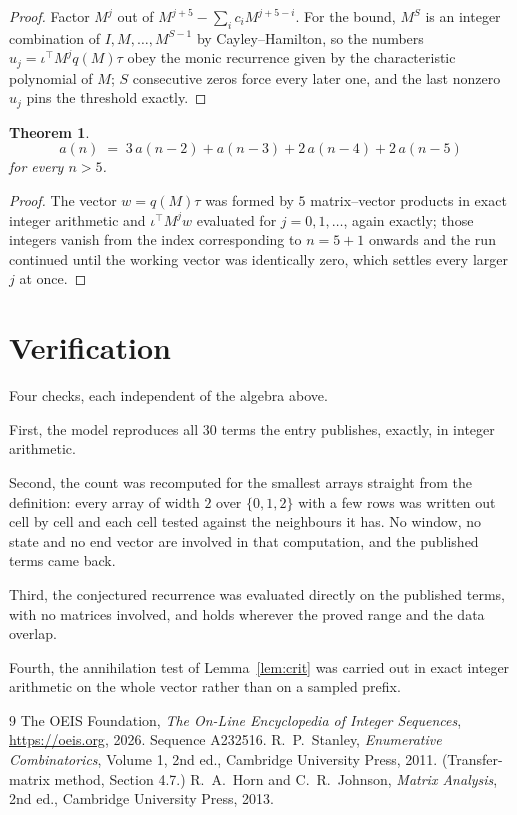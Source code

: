 \documentclass[11pt,a4paper]{article}
\theoremstyle{plain}
\newtheorem{theorem}{Theorem}
\theoremstyle{definition}
\begin{document}
\begin{proof}
Factor $M^{j}$ out of $M^{j+5}-\sum_ic_iM^{j+5-i}$. For the bound, $M^{S}$
is an integer combination of $I,M,\dots,M^{S-1}$ by Cayley--Hamilton, so the numbers
$u_j=\iota^{\!\top}M^{j}q(M)\tau$ obey the monic recurrence given by the characteristic
polynomial of $M$; $S$ consecutive zeros force every later one, and the last nonzero $u_j$
pins the threshold exactly.
\end{proof}

\begin{theorem}
\[
a(n)\;=\;3\,a(n-2) + a(n-3) + 2\,a(n-4) + 2\,a(n-5)
\]
for every $n>5$.
\end{theorem}

\begin{proof}
The vector $w=q(M)\tau$ was formed by $5$ matrix--vector products in exact integer
arithmetic and $\iota^{\!\top}M^{j}w$ evaluated for $j=0,1,\dots$, again exactly; those
integers vanish from the index corresponding to $n=5+1$ onwards and the run continued
until the working vector was identically zero, which settles every larger $j$ at once.
\end{proof}

\section{Verification}

Four checks, each independent of the algebra above.

First, the model reproduces all $30$ terms the entry publishes, exactly, in integer
arithmetic.

Second, the count was recomputed for the smallest arrays straight from the definition: every
array of width $2$ over $\{0,1,2\}$ with a few rows was written out cell by cell and each cell
tested against the neighbours it has. No window, no state and no end vector are involved in that
computation, and the published terms came back.

Third, the conjectured recurrence was evaluated directly on the published terms, with no
matrices involved, and holds wherever the proved range and the data overlap.

Fourth, the annihilation test of Lemma~\ref{lem:crit} was carried out in exact integer
arithmetic on the whole vector rather than on a sampled prefix.

\begin{thebibliography}{9}
 The OEIS Foundation, \emph{The On-Line Encyclopedia of Integer
Sequences}, \url{https://oeis.org}, 2026. Sequence A232516.
 R.~P.~Stanley, \emph{Enumerative Combinatorics}, Volume 1, 2nd ed.,
Cambridge University Press, 2011. (Transfer-matrix method, Section 4.7.)
 R.~A.~Horn and C.~R.~Johnson, \emph{Matrix Analysis}, 2nd ed., Cambridge
University Press, 2013.
\end{thebibliography}
\end{document}
